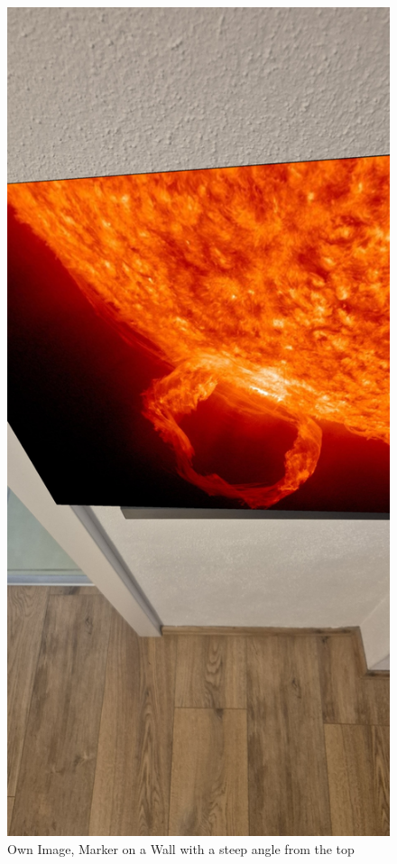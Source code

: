 \documentclass[a4paper,twocolumn]{article}
\begin{document}
\begin{figure}[htbp]
    \centering
    \includegraphics[width=\columnwidth, keepaspectratio]{newOutput/20241129_153147.jpeg}
    \caption{Own Image, Marker on a Wall with a steep angle from the top\cite{tim-schweitzer}}
    \label{fig:example-pappendix4}
\end{figure}
\end{document}
